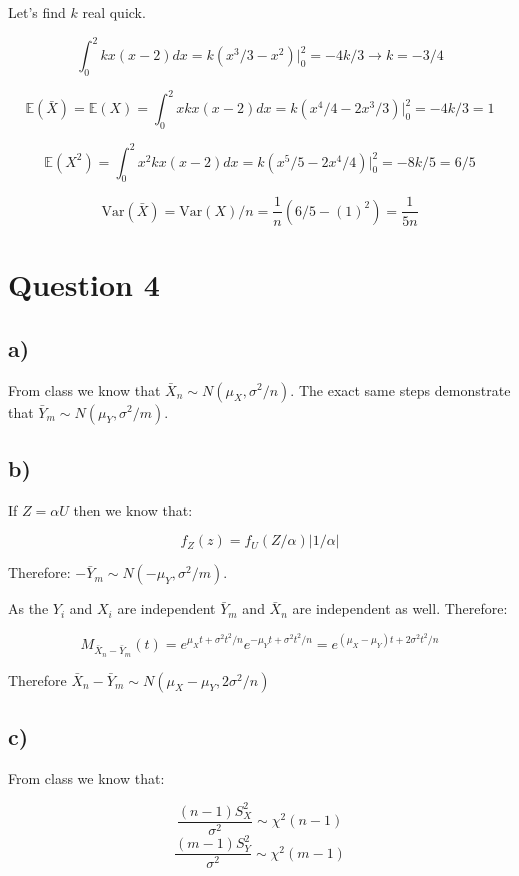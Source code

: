 \documentclass[11pt]{article}
\begin{document}
Let's find $k$ real quick. 

$$\int_0^2 kx(x-2)dx=k\left( x^3/3 - x^2\right)\Big|_0^2=-4k/3\rightarrow k = -3/4$$

$$\mathbb{E}(\bar{X}) = \mathbb{E}(X) = \int_0^2 xkx(x-2)dx = k\left(x^4/4 - 2x^3/3 \right)\Big|_0^2=-4k/3=1$$

$$\mathbb{E}(X^2) = \int_0^2 x^2kx(x-2)dx = k\left(x^5/5 - 2x^4/4 \right)\Big|_0^2=-8k/5=6/5$$

$$\text{Var}(\bar{X}) = \text{Var}(X)/n = \frac{1}{n}\left(6/5 -  (1)^2\right)=\frac{1}{5n}$$

\section*{Question 4}

\subsection*{a)}

From class we know that $\bar{X}_n \sim N(\mu_X, \sigma^2 / n)$. The exact same steps demonstrate that $\bar{Y}_m \sim N(\mu_Y, \sigma^2 / m)$. 

\subsection*{b)}

If $Z = \alpha U$ then we know that:

$$f_Z(z) = f_U(Z/\alpha) |1/\alpha| $$

Therefore: $-\bar{Y}_m \sim N(-\mu_Y, \sigma^2 /m)$. \newline


As the $Y_i$ and $X_i$ are independent $\bar{Y}_m $ and $\bar{X}_n$ are independent as well. Therefore:

$$M_{\bar{X}_n  - \bar{Y}_m}(t) = e^{\mu_X t +\sigma^2 t^2 /n}e^{-\mu_Y t +\sigma^2 t^2 /n}= e^{(\mu_X-\mu_Y) t +2\sigma^2 t^2 /n}$$

Therefore $\bar{X}_n  - \bar{Y}_m \sim N(\mu_X - \mu_Y, 2\sigma^2 / n)$

\subsection*{c)}

From class we know that:

$$\frac{(n-1)S_X^2}{\sigma^2}\sim \chi^2(n-1)$$
$$\frac{(m-1)S_Y^2}{\sigma^2}\sim \chi^2(m-1)$$
\end{document}
